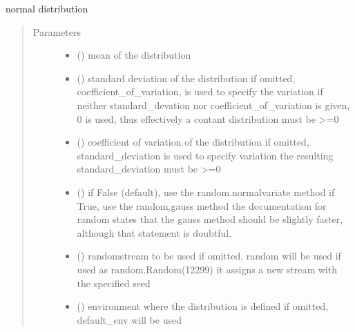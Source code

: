 \documentclass[letterpaper,10pt,english]{sphinxmanual}
\begin{document}
\begin{fulllineitems}
\label{\detokenize{Reference:salabim.Normal}}
normal distribution
\begin{quote}\begin{description}
\item[{Parameters}] \leavevmode\begin{itemize}
\item {} 
 () \textendash{} mean of the distribution

\item {} 
 () \textendash{} standard deviation of the distribution 
if omitted, coefficient\_of\_variation, is used to specify the variation
if neither standard\_devation nor coefficient\_of\_variation is given, 0 is used,
thus effectively a contant distribution 
must be \textgreater{}=0

\item {} 
 () \textendash{} coefficient of variation of the distribution 
if omitted, standard\_deviation is used to specify variation 
the resulting standard\_deviation must be \textgreater{}=0

\item {} 
 () \textendash{} if False (default), use the random.normalvariate method 
if True, use the random.gauss method 
the documentation for random states that the gauss method should be slightly faster,
although that statement is doubtful.

\item {} 
 () \textendash{} randomstream to be used 
if omitted, random will be used 
if used as random.Random(12299)
it assigns a new stream with the specified seed

\item {} 
 ({\hyperref[\detokenize{Reference:salabim.Environment}]{}}) \textendash{} environment where the distribution is defined 
if omitted, default\_env will be used


\end{itemize}
\end{description}
\end{quote}
\end{fulllineitems}
\end{document}
